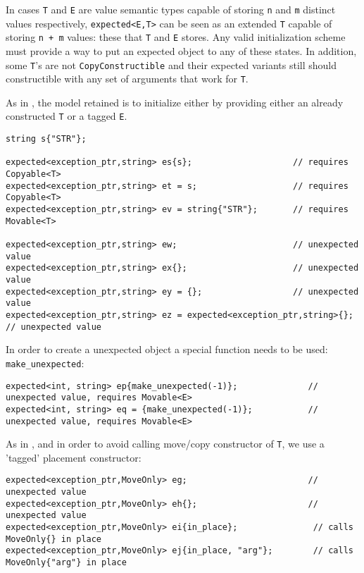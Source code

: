 \documentclass[a4paper,10pt]{article}
\newcommand{\cpp}[1]{\lstinline{#1}}
\begin{document}
In cases \cpp{T} and \cpp{E} are value semantic types capable of storing \cpp{n} and \cpp{m} distinct values respectively, \cpp{expected<E,T>} can be seen as an extended \cpp{T} capable of storing \cpp{n + m} values: these that \cpp{T} and \cpp{E} stores. Any valid initialization scheme must provide a way to put an expected object to any of these states. In addition, some \cpp{T}'s  are not \cpp{CopyConstructible} and their expected variants still should constructible with any set of arguments that work for \cpp{T}. 

As in \cite{OptionalRev4}, the model retained is to initialize either by providing either an already constructed \cpp{T} or a tagged \cpp{E}.

\begin{lstlisting}
string s{"STR"};

expected<exception_ptr,string> es{s};                    // requires Copyable<T>
expected<exception_ptr,string> et = s;                   // requires Copyable<T>
expected<exception_ptr,string> ev = string{"STR"};       // requires Movable<T>

expected<exception_ptr,string> ew;                       // unexpected value
expected<exception_ptr,string> ex{};                     // unexpected value
expected<exception_ptr,string> ey = {};                  // unexpected value
expected<exception_ptr,string> ez = expected<exception_ptr,string>{};  // unexpected value
\end{lstlisting}

In order to create a unexpected object a special function needs to be used: \cpp{make_unexpected}:

\begin{lstlisting}
expected<int, string> ep{make_unexpected(-1)};              // unexpected value, requires Movable<E>
expected<int, string> eq = {make_unexpected(-1)};           // unexpected value, requires Movable<E>
\end{lstlisting}

As in \cite{OptionalRev4}, and in order to avoid calling move/copy constructor of \cpp{T}, we use a 'tagged' placement constructor: 

\begin{lstlisting}
expected<exception_ptr,MoveOnly> eg;                        // unexpected value
expected<exception_ptr,MoveOnly> eh{};                      // unexpected value
expected<exception_ptr,MoveOnly> ei{in_place};               // calls MoveOnly{} in place
expected<exception_ptr,MoveOnly> ej{in_place, "arg"};        // calls MoveOnly{"arg"} in place
\end{lstlisting}
\end{document}
